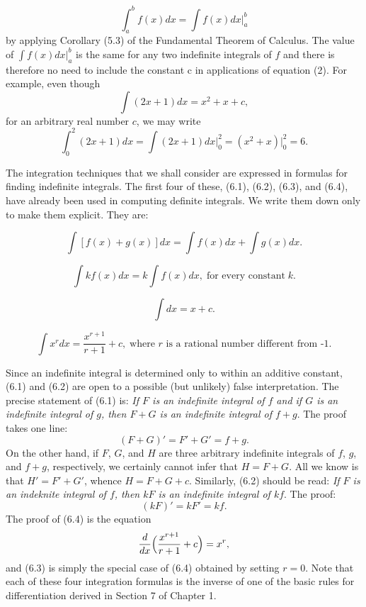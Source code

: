 \begin{equation}
\int_{a}^{b} f(x) dx = \int f(x) dx \Big|_{a}^{b}
\label{eq4.6.2}
\end{equation}
\noindent by applying Corollary (5.3) of the Fundamental Theorem of Calculus. The value of $\int f(x)dx|_{a}^{b}$ is the same for any two indefinite integrals of $f$ and there is therefore no need to include the constant c in applications of equation (2). For example, even though
$$
\int (2x + 1) dx = x^2 + x + c,
$$
\noindent for an arbitrary real number $c$, we may write
$$
\int_{0}^{2} (2x + 1 ) dx = \int (2x + 1 ) dx \Big|_{0}^{2} 
= (x^2 + x) \Big|_{0}^{2} = 6.
$$

The integration techniques that we shall consider are expressed in formulas for finding indefinite integrals. The first four of these, (6.1), (6.2), (6.3), and (6.4), have already been used in computing definite integrals. We
write them down only to make them explicit. They are:

\begin{theorem} %
$$\int [f(x) + g(x)]dx = \int f(x)dx + \int g(x)dx.$$
\end{theorem}

\begin{theorem} %
$$
\int kf(x) dx = k \int f(x) dx, \;\mbox{for every constant}\; k. 
$$
\end{theorem}

\begin{theorem} %
$$\int dx = x + c. $$ 
\end{theorem}

\begin{theorem} %
$$
\int x^r dx =  \frac{x^{r + 1}}{r + 1} + c, \;\mbox{where $r$ is a rational number different from -1.}
$$
\end{theorem}

Since an indefinite integral is determined only to within an additive constant, (6.1) and (6.2) are open to a possible (but unlikely) false interpretation. The precise statement of (6.1) is: \textit{If $F$ is an indefinite integral of $f$ and if $G$ is an indefinite integral of $g$, then $F + G$ is an indefinite integral of $f + g$}. The proof takes one line:
$$
(F+ G)' = F' + G' = f + g.
$$
\noindent On the other hand, if $F$, $G$, and $H$ are three arbitrary indefinite integrals of $f$, $g$, and $f + g$, respectively, we certainly cannot infer that $H = F + G$. All we know is that $H' = F' + G'$, whence $H = F + G + c$. Similarly, (6.2) should be read: \textit{If $F$ is an indeknite integral of $f$, then $kF$ is an indefinite integral of $kf$}. The proof:
$$
(kF)' = kF' = kf.
$$
\noindent The proof of (6.4) is the equation
$$
\frac{d}{dx} \Bigl( \frac{x^{r + 1}}{r + 1} + c \Bigr) = x^r,
$$
\noindent and (6.3) is simply the special case of (6.4) obtained by setting $r = 0$. Note that each of these four integration formulas is the inverse of one of the basic rules for differentiation derived in Section 7 of Chapter 1. 
\medskip

